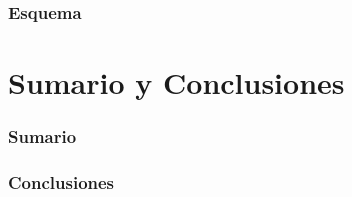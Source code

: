 \documentclass[a4paper,slidestop,xcolor=pst,blue]{beamer}
\begin{document}
\begin{frame}[c]
    \frametitle{Esquema}
\end{frame}

\section{Sumario y Conclusiones}

\begin{frame}[c]
    \frametitle{Sumario}
\end{frame}

\begin{frame}[c]
    \frametitle{Conclusiones}
\end{frame}
\end{document}
